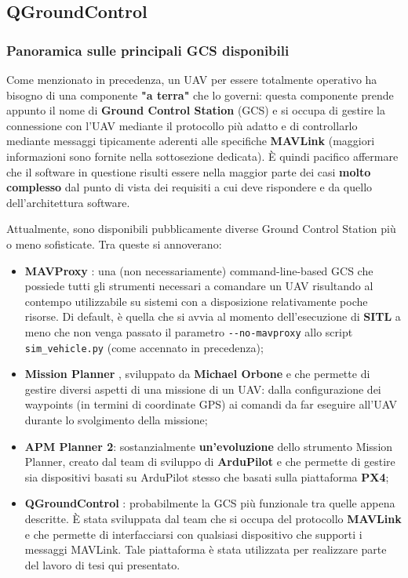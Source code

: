 \documentclass[a4paper, 12pt, oneside]{article}
\theoremstyle{definition}
\begin{document}
\newpage

\subsection{QGroundControl}

\subsubsection{Panoramica sulle principali GCS disponibili}

Come menzionato in precedenza, un UAV per essere totalmente operativo ha bisogno di una componente \textbf{"a terra"} che lo governi: questa componente prende appunto il nome di \textbf{Ground Control Station} (GCS) e si occupa di gestire la connessione con l'UAV mediante il protocollo più adatto e di controllarlo mediante messaggi tipicamente aderenti alle specifiche \textbf{MAVLink} (maggiori informazioni sono fornite nella sottosezione dedicata). È quindi pacifico affermare che il software in questione risulti essere nella maggior parte dei casi \textbf{molto complesso} dal punto di vista dei requisiti a cui deve rispondere e da quello dell'architettura software.

Attualmente, sono disponibili pubblicamente diverse Ground Control Station più o meno sofisticate. Tra queste si annoverano:

\begin{itemize}
    \item \textbf{MAVProxy} \cite{mavproxy}: una (non necessariamente) command-line-based GCS che possiede tutti gli strumenti necessari a comandare un UAV risultando al contempo utilizzabile su sistemi con a disposizione relativamente poche risorse. Di default, è quella che si avvia al momento dell'esecuzione di \textbf{SITL} a meno che non venga passato il parametro \texttt{-{}-no-mavproxy} allo script \texttt{sim\_vehicle.py} (come accennato in precedenza);
    \item \textbf{Mission Planner} \cite{mission-planner}, sviluppato da \textbf{Michael Orbone} e che permette di gestire diversi aspetti di una missione di un UAV: dalla configurazione dei waypoints (in termini di coordinate GPS) ai comandi da far eseguire all'UAV durante lo svolgimento della missione;
    \item \textbf{APM Planner 2}: sostanzialmente \textbf{un'evoluzione} dello strumento Mission Planner, creato dal team di sviluppo di \textbf{ArduPilot} e che permette di gestire sia dispositivi basati su ArduPilot stesso che basati sulla piattaforma \textbf{PX4};
    \item \textbf{QGroundControl} \cite{qgroundcontrol}: probabilmente la GCS più funzionale tra quelle appena descritte. È stata sviluppata dal team che si occupa del protocollo \textbf{MAVLink} e che permette di interfacciarsi con qualsiasi dispositivo che supporti i messaggi MAVLink. Tale piattaforma è stata utilizzata per realizzare parte del lavoro di tesi qui presentato. 
\end{itemize}
\end{document}
